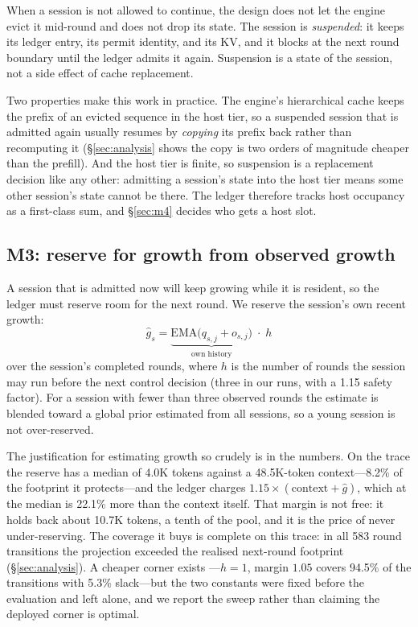 When a session is not allowed to continue, the design does not let the engine evict it
mid-round and does not drop its state. The session is \emph{suspended}: it keeps its
ledger entry, its permit identity, and its KV, and it blocks at the next round boundary
until the ledger admits it again. Suspension is a state of the session, not a side effect
of cache replacement.

Two properties make this work in practice. The engine's hierarchical cache keeps the
prefix of an evicted sequence in the host tier, so a suspended session that is admitted
again usually resumes by \emph{copying} its prefix back rather than recomputing it
(\S\ref{sec:analysis} shows the copy is two orders of magnitude cheaper than the
prefill). And the host tier is finite, so suspension is a replacement decision like any
other: admitting a session's state into the host tier means some other session's state
cannot be there. The ledger therefore tracks host occupancy as a first-class sum, and
\S\ref{sec:m4} decides who gets a host slot.

\subsection{M3: reserve for growth from observed growth}
\label{sec:m3}

A session that is admitted now will keep growing while it is resident, so the ledger must
reserve room for the next round. We reserve the session's own recent growth:
\[
\hat g_s=\underbrace{\mathrm{EMA}\bigl(q_{s,j}+o_{s,j}\bigr)}_{\text{own history}}\;\cdot\;h
\]
over the session's completed rounds, where $h$ is the number of rounds the session may run
before the next control decision (three in our runs, with a 1.15 safety factor). For a
session with fewer than three observed rounds the estimate is blended toward a global prior
estimated from all sessions, so a young session is not over-reserved.

The justification for estimating growth so crudely is in the numbers. On the trace the
reserve has a median of 4.0K tokens against a 48.5K-token context---8.2\% of the footprint
it protects---and the ledger charges $1.15\times(\text{context}+\hat g)$, which at the
median is 22.1\% more than the context itself. That margin is not free: it holds back about
10.7K tokens, a tenth of the pool, and it is the price of never under-reserving. The
coverage it buys is complete on this trace: in all 583 round transitions the projection
exceeded the realised next-round footprint (\S\ref{sec:analysis}). A cheaper corner exists
---$h=1$, margin $1.05$ covers 94.5\% of the transitions with 5.3\% slack---but the two
constants were fixed before the evaluation and left alone, and we report the sweep rather
than claiming the deployed corner is optimal.

